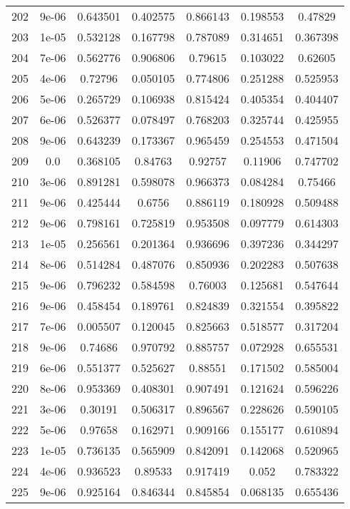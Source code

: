 \begin{table}
\begin{tabular*}{\linewidth}{c|c|c|c|c|c|c}
202 & 9e-06 & 0.643501 & 0.402575 & 0.866143 & 0.198553 & 0.47829\\
203 & 1e-05 & 0.532128 & 0.167798 & 0.787089 & 0.314651 & 0.367398\\
204 & 7e-06 & 0.562776 & 0.906806 & 0.79615 & 0.103022 & 0.62605\\
205 & 4e-06 & 0.72796 & 0.050105 & 0.774806 & 0.251288 & 0.525953\\
206 & 5e-06 & 0.265729 & 0.106938 & 0.815424 & 0.405354 & 0.404407\\
207 & 6e-06 & 0.526377 & 0.078497 & 0.768203 & 0.325744 & 0.425955\\
208 & 9e-06 & 0.643239 & 0.173367 & 0.965459 & 0.254553 & 0.471504\\
209 & 0.0 & 0.368105 & 0.84763 & 0.92757 & 0.11906 & 0.747702\\
210 & 3e-06 & 0.891281 & 0.598078 & 0.966373 & 0.084284 & 0.75466\\
211 & 9e-06 & 0.425444 & 0.6756 & 0.886119 & 0.180928 & 0.509488\\
212 & 9e-06 & 0.798161 & 0.725819 & 0.953508 & 0.097779 & 0.614303\\
213 & 1e-05 & 0.256561 & 0.201364 & 0.936696 & 0.397236 & 0.344297\\
214 & 8e-06 & 0.514284 & 0.487076 & 0.850936 & 0.202283 & 0.507638\\
215 & 9e-06 & 0.796232 & 0.584598 & 0.76003 & 0.125681 & 0.547644\\
216 & 9e-06 & 0.458454 & 0.189761 & 0.824839 & 0.321554 & 0.395822\\
217 & 7e-06 & 0.005507 & 0.120045 & 0.825663 & 0.518577 & 0.317204\\
218 & 9e-06 & 0.74686 & 0.970792 & 0.885757 & 0.072928 & 0.655531\\
219 & 6e-06 & 0.551377 & 0.525627 & 0.88551 & 0.171502 & 0.585004\\
220 & 8e-06 & 0.953369 & 0.408301 & 0.907491 & 0.121624 & 0.596226\\
221 & 3e-06 & 0.30191 & 0.506317 & 0.896567 & 0.228626 & 0.590105\\
222 & 5e-06 & 0.97658 & 0.162971 & 0.909166 & 0.155177 & 0.610894\\
223 & 1e-05 & 0.736135 & 0.565909 & 0.842091 & 0.142068 & 0.520965\\
224 & 4e-06 & 0.936523 & 0.89533 & 0.917419 & 0.052 & 0.783322\\
225 & 9e-06 & 0.925164 & 0.846344 & 0.845854 & 0.068135 & 0.655436\\
\end{tabular*}
\end{table}
